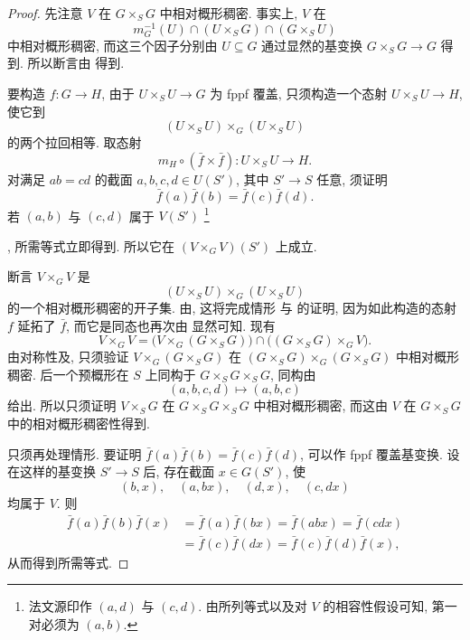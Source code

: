 \begin{proof}
先注意 \(V\) 在 \(G\times_S G\) 中相对概形稠密.
事实上, \(V\) 在
\[
  m_G^{-1}(U)\cap(U\times_S G)\cap(G\times_S U)
\]
中相对概形稠密, 而这三个因子分别由 \(U\subseteq G\)
通过显然的基变换 \(G\times_S G\to G\) 得到.
所以断言由 得到.

要构造 \(f:G\to H\), 由于 \(U\times_S U\to G\) 为 fppf 覆盖,
只须构造一个态射 \(U\times_S U\to H\), 使它到
\[
  (U\times_S U)\times_G(U\times_S U)
\]
的两个拉回相等. 取态射
\[
  m_H\circ(\bar f\times\bar f):U\times_S U\longrightarrow H.
\]
对满足 \(ab=cd\) 的截面 \(a,b,c,d\in U(S')\), 其中 \(S'\to S\) 任意, 须证明
\[
  \bar f(a)\bar f(b)=\bar f(c)\bar f(d).
\]
若 \((a,b)\) 与 \((c,d)\) 属于 \(V(S')\)\begingroup
\renewcommand{\thefootnote}{\ensuremath{\ddagger}}\footnote{法文源印作 \((a,d)\) 与 \((c,d)\).
由所列等式以及对 \(V\) 的相容性假设可知, 第一对必须为 \((a,b)\).}
\addtocounter{footnote}{-1}
\endgroup, 所需等式立即得到.
所以它在 \((V\times_G V)(S')\) 上成立.

断言 \(V\times_G V\) 是
\[
  (U\times_S U)\times_G(U\times_S U)
\]
的一个相对概形稠密的开子集.
由, 这将完成情形
\textup{} 与
\textup{} 的证明,
因为如此构造的态射 \(f\) 延拓了 \(\bar f\),
而它是同态也再次由 显然可知.
现有
\[
  V\times_G V
  =
  \bigl(V\times_G(G\times_S G)\bigr)
  \cap
  \bigl((G\times_S G)\times_G V\bigr).
\]
由对称性及,
只须验证 \(V\times_G(G\times_S G)\)
在 \((G\times_S G)\times_G(G\times_S G)\) 中相对概形稠密.
后一个预概形在 \(S\) 上同构于 \(G\times_S G\times_S G\), 同构由
\[
  (a,b,c,d)\longmapsto(a,b,c)
\]
给出. 所以只须证明 \(V\times_S G\) 在 \(G\times_S G\times_S G\)
中相对概形稠密, 而这由 \(V\) 在 \(G\times_S G\) 中的相对概形稠密性得到.

只须再处理情形\textup{}.
要证明 \(\bar f(a)\bar f(b)=\bar f(c)\bar f(d)\), 可以作 fppf 覆盖基变换.
设在这样的基变换 \(S'\to S\) 后, 存在截面 \(x\in G(S')\), 使
\[
  (b,x),\quad(a,bx),\quad(d,x),\quad(c,dx)
\]
均属于 \(V\). 则
\[
\begin{aligned}
  \bar f(a)\bar f(b)\bar f(x)
    &=\bar f(a)\bar f(bx)
     =\bar f(abx)
     =\bar f(cdx)\\
    &=\bar f(c)\bar f(dx)
     =\bar f(c)\bar f(d)\bar f(x),
\end{aligned}
\]
从而得到所需等式.


\end{proof}
